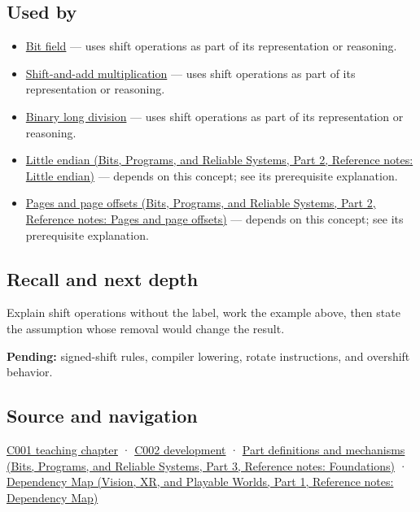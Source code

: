 \subsection{Used by}\label{appendix-73425b25118e-used-by}

\hypertarget{appendix-73425b25118e-used-by}{}

\begin{itemize}
\item
  \hyperref[appendix-ac697f5c66e8]{Bit field} --- uses shift operations as part of its representation or reasoning.
\item
  \hyperref[appendix-a65290d66ed9]{Shift-and-add multiplication} --- uses shift operations as part of its representation or reasoning.
\item
  \hyperref[appendix-89985e6a2685]{Binary long division} --- uses shift operations as part of its representation or reasoning.
\item
  \href{../01-Bits-Programs-and-Reliable-Systems-P02/main.pdf\#appendix-367b6abf460e}{Little endian (Bits, Programs, and Reliable Systems, Part 2, Reference notes: Little endian)} --- depends on this concept; see its prerequisite explanation.
\item
  \href{../01-Bits-Programs-and-Reliable-Systems-P02/main.pdf\#appendix-0c67cd5bf30a}{Pages and page offsets (Bits, Programs, and Reliable Systems, Part 2, Reference notes: Pages and page offsets)} --- depends on this concept; see its prerequisite explanation.
\end{itemize}

\subsection{Recall and next depth}\label{appendix-73425b25118e-recall-and-next-depth}

\hypertarget{appendix-73425b25118e-recall-and-next-depth}{}

Explain shift operations without the label, work the example above, then state the assumption whose removal would change the result.

\textbf{Pending:} signed-shift rules, compiler lowering, rotate instructions, and overshift behavior.

\subsection{Source and navigation}\label{appendix-73425b25118e-source-and-navigation}

\hypertarget{appendix-73425b25118e-source-and-navigation}{}

\hyperref[01-foundations-i-ch001-from-a-signal-to-an-interpretation]{C001 teaching chapter} · \hyperref[01-foundations-i-ch001-arithmetic-becomes-a-policy]{C002 development} · \href{../01-Bits-Programs-and-Reliable-Systems-P03/main.pdf\#appendix-fd090d982a15}{Part definitions and mechanisms (Bits, Programs, and Reliable Systems, Part 3, Reference notes: Foundations)} · \href{../07-Vision-XR-and-Playable-Worlds-P01/main.pdf\#appendix-4ad47bdd269a}{Dependency Map (Vision, XR, and Playable Worlds, Part 1, Reference notes: Dependency Map)}

